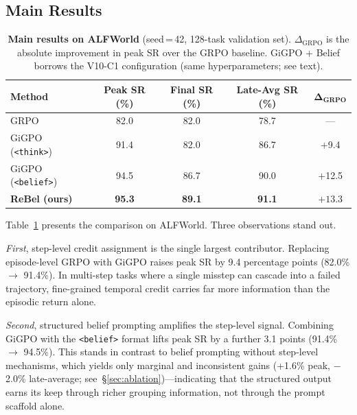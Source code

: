 \subsection{Main Results}
\label{sec:main_results}

\begin{table}[t]
  \centering
  \caption{%
    \textbf{Main results on ALFWorld} (seed\,=\,42, 128-task validation set).
    $\Delta_{\text{GRPO}}$ is the absolute improvement in peak SR over the
    GRPO baseline.
    GiGPO + Belief borrows the V10-C1 configuration (same hyperparameters;
    see text).
  }
  \label{tab:main_results}
  \vspace{4pt}
  \small
  \renewcommand{\arraystretch}{1.15}
  \begin{tabular}{@{}lcccc@{}}
    \toprule
    \textbf{Method}
      & \textbf{Peak SR (\%)}
      & \textbf{Final SR (\%)}
      & \textbf{Late-Avg SR (\%)}
      & $\boldsymbol{\Delta}_{\textbf{GRPO}}$ \\
    \midrule
    GRPO
      & 82.0 & 82.0 & 78.7 & --- \\
    GiGPO (\texttt{<think>})
      & 91.4 & 82.0 & 86.7 & $+$9.4 \\
    GiGPO (\texttt{<belief>})
      & 94.5 & 86.7 & 90.0 & $+$12.5 \\
    \textbf{ReBel (ours)}
      & \textbf{95.3} & \textbf{89.1} & \textbf{91.1} & $\mathbf{+13.3}$ \\
    \bottomrule
  \end{tabular}
\end{table}

Table~\ref{tab:main_results} presents the comparison on ALFWorld.
Three observations stand out.

\textit{First}, step-level credit assignment is the single largest contributor.
Replacing episode-level GRPO with GiGPO raises peak SR by 9.4 percentage points
(82.0\% $\to$ 91.4\%).
In multi-step tasks where a single misstep can cascade into a failed trajectory,
fine-grained temporal credit carries far more information than the episodic
return alone.

\textit{Second}, structured belief prompting amplifies the step-level signal.
Combining GiGPO with the \texttt{<belief>} format lifts peak SR by a further
3.1 points (91.4\% $\to$ 94.5\%).
This stands in contrast to belief prompting without step-level mechanisms,
which yields only marginal and inconsistent gains (+1.6\% peak, $-$2.0\% late-average;
see~\S\ref{sec:ablation})---indicating that the structured output earns its keep
through richer grouping information, not through the prompt scaffold alone.

